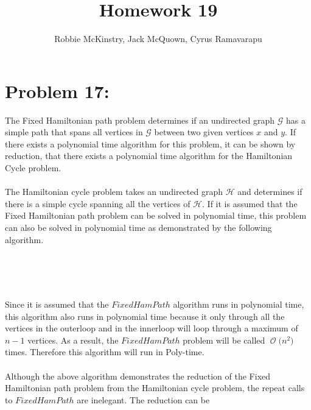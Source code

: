 \documentclass[12pt]{article}
\newcommand{\BigO}[1]{\ensuremath{\operatorname{\mathcal{O}}\bigl(#1\bigr)}}
\begin{document}
\title{Homework 19}
\author{Robbie McKinstry, Jack McQuown, Cyrus Ramavarapu}
\renewcommand{\today}{17 October 2016}
\renewcommand{\baselinestretch}{1.5}
\maketitle

\section*{Problem 17: }
The Fixed Hamiltonian path problem determines if an undirected graph
$\mathcal{G}$ has a simple path that spans all vertices in $\mathcal{G}$
between two given vertices $x$ and $y$.  If there exists a polynomial
time algorithm for this problem, it can be shown by reduction, that
there exists a polynomial time algorithm for the Hamiltonian Cycle
problem.\\\\
The Hamiltonian cycle problem takes an undirected graph $\mathcal{H}$
and determines if there is a simple cycle spanning all the vertices
of $\mathcal{H}$. If it is assumed that the Fixed Hamiltonian path
problem can be solved in polynomial time, this problem can also be
solved in polynomial time as demonstrated by the following algorithm.\\\\ 
\begin{algorithm}[H]
\\
\\
{
{
{}
}
}
\end{algorithm}
Since it is assumed that the $FixedHamPath$ algorithm runs
in polynomial time, this algorithm also runs in polynomial time because
it only through all the vertices in the outerloop and in the innerloop
will loop through a maximum of $n-1$ vertices.  As a result, the
$FixedHamPath$ problem will be called \BigO{n^2} times.  Therefore
this algorithm will run in Poly-time.\\\\
Although the above algorithm demonstrates the reduction of the
Fixed Hamiltonian path problem from the Hamiltonian cycle problem, the
repeat calls to $FixedHamPath$ are inelegant. The reduction can be 
\end{document}
